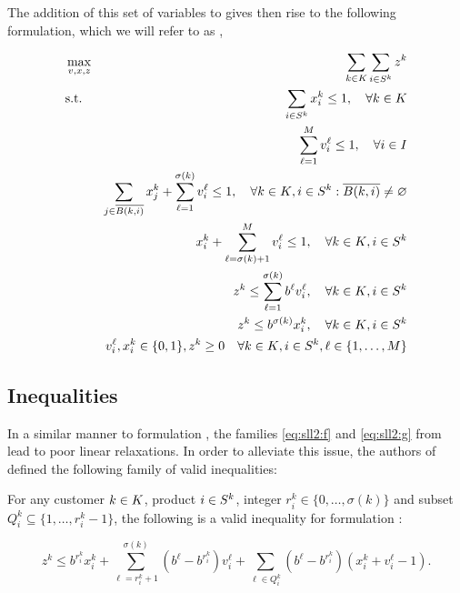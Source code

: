 The addition of this set of variables to \slnl gives then rise to the following
formulation, which we will refer to as \sllb,

{
    \newcommand{\bover}   {\overline{B(k, i)}}
    \newcommand{\bne}     {\bover\neq\varnothing}
    \newcommand{\sumk}    {\sum_{\kk}}
    \newcommand{\sumi}    {\sum_{\is}}
    \newcommand{\sumlm}   {\sum_{\ell=1}^{M}}
    \newcommand{\sumj}    {\sum_{j\in\bover}}
    \newcommand{\sumls}   {\sum_{\ell=1}^{\sigma(k)}}
    \newcommand{\sumlsm}  {\sum_{\ell=\sigma(k)+1}^{M}}
    
    \begin{eqnarray}
        &\max_{v, x, z}
            & \sumk\sumi z^k                                           \label{eq:sll2:a}\\
        &\text{s.t.}
            & \sumi  x_i^k                  \leq 1, \quad\forall\kk    \label{eq:sll2:b}\\
        &   & \sumlm v_i^\ell               \leq 1, \quad\forall\ii    \label{eq:sll2:c}\\
        &   & \sumj x_j^k + \sumls v_i^\ell \leq 1, \quad\forall\kk,\is:\bne
                                                                       \label{eq:sll2:d}\\
        &   & x_i^k + \sumlsm v_i^\ell      \leq 1, \quad\forall\kk,\is\label{eq:sll2:e}\\
        &   & z^k \leq \sumls b^\ell v_i^\ell,      \quad\forall\kk,\is\label{eq:sll2:f}\\
        &   & z^k \leq b^{\sigma(k)} x_i^k,         \quad\forall\kk,\is\label{eq:sll2:g}\\
        &   & v_i^\ell, x_i^k \in \binset, z^k\geq 0\quad\forall\kk,\is,\lm
                                                                       \label{eq:sll2:h}
    \end{eqnarray}
}

\subsection{Inequalities} %
\label{ssc:las:sll2:inequalities}

In a similar manner to formulation \slla, the families \eqref{eq:sll2:f} and
\eqref{eq:sll2:g} from \sllb lead to poor linear relaxations. In order to
alleviate this issue, the authors of \cite{ca:rpp} defined the following family
of valid inequalities:

\begin{proposition}
    For any customer ${k \in K}$, product ${i \in S^k}$, integer
    $r_i^k\in\{0,\ldots,\sigma(k)\}$ and subset $Q_i^k\subseteq\{1, \ldots,
    r_i^k-1\}$, the following is a valid inequality for formulation \sllb:

    \begin{equation}
        z^k \leq
            b^{r_i^k}x_i^k
            + \sum_{\ell=r_i^k+1}^{\sigma(k)}
                \left(b^\ell - b^{r_i^k}\right) v_i^\ell
            + \sum_{\ell\in Q_i^k}
                \left(b^\ell - b^{r_i^k}\right)\left(x_i^k+v_i^\ell-1\right).
        \label{eq:sll2-inequalities}
    \end{equation}
\end{proposition}

